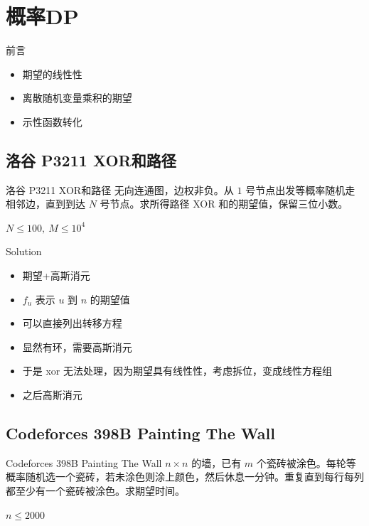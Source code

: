 ﻿\documentclass[aspectratio=169]{ctexbeamer}
\begin{document}
\section{概率DP}

\begin{frame}{前言}
    \begin{itemize}
        \item 期望的线性性
        \item 离散随机变量乘积的期望
        \item 示性函数转化
    \end{itemize}
\end{frame}

\subsection{洛谷 P3211 XOR和路径}
\begin{frame}{洛谷 P3211 XOR和路径}
    无向连通图，边权非负。从 $1$ 号节点出发等概率随机走相邻边，直到到达 $N$ 号节点。求所得路径 XOR 和的期望值，保留三位小数。
    
    $N\le 100,\ M\le 10^4$
\end{frame}

\begin{frame}{Solution}
    \begin{itemize}
        \item 期望+高斯消元
        \item $f_u$ 表示 $u$ 到 $n$ 的期望值
        \item 可以直接列出转移方程
        \item 显然有环，需要高斯消元
        \item 于是 xor 无法处理，因为期望具有线性性，考虑拆位，变成线性方程组
        \item 之后高斯消元
    \end{itemize}
\end{frame}

\subsection{Codeforces 398B Painting The Wall}
\begin{frame}{Codeforces 398B Painting The Wall}
    $n\times n$ 的墙，已有 $m$ 个瓷砖被涂色。每轮等概率随机选一个瓷砖，若未涂色则涂上颜色，然后休息一分钟。重复直到每行每列都至少有一个瓷砖被涂色。求期望时间。
    
    $n\le 2000$
\end{frame}
\end{document}
